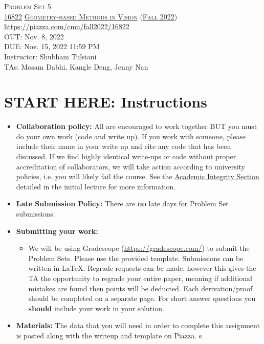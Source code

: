 \documentclass[11pt,addpoints,answers]{exam}
\title{\textsc{\hwName}} %
\author{}
\date{}
\date{}
\numberwithin{equation}{section} %
\numberwithin{figure}{section} %
\numberwithin{table}{section} %
\newcommand{\courseNum}{\href{https://geometric3d.github.io}{16822}}
\newcommand{\courseName}{\href{https://geometric3d.github.io}{Geometry-based Methods in Vision}}
\newcommand{\courseSem}{\href{https://geometric3d.github.io}{Fall 2022}}
\newcommand{\courseUrl}{\url{https://piazza.com/cmu/fall2022/16822}}
\newcommand{\hwNum}{Problem Set 5}
\newcommand{\hwTopic}{N-view Geometry}
\newcommand{\outDate}{Nov. 8, 2022}
\newcommand{\dueDate}{Nov. 15, 2022 11:59 PM}
\newcommand{\instructorName}{Shubham Tulsiani}
\newcommand{\taNames}{Mosam Dabhi, Kangle Deng, Jenny Nan}
\begin{document}
\section*{}
\begin{center}
  \textsc{\LARGE \hwNum} \\
  \vspace{1em}
  \textsc{\large \courseNum{} \courseName{} (\courseSem)} \\
  \courseUrl\\
  \vspace{1em}
  OUT: \outDate \\
  DUE: \dueDate \\
  Instructor: \instructorName \\
  TAs: \taNames
\end{center}

\section*{START HERE: Instructions}
\begin{itemize}
\item \textbf{Collaboration policy:} All are encouraged to work together BUT you must do your own work (code and write up). If you work with someone, please include their name in your write up and cite any code that has been discussed. If we find highly identical write-ups or code without proper accreditation of collaborators, we will take action according to university policies, i.e. you will likely fail the course. See the \href{https://www.dropbox.com/s/z6o0tinc9eaez46/L01_Overview.pdf?dl=0}{Academic Integrity Section} detailed in the initial lecture for more information.

\item\textbf{Late Submission Policy:} There are \textbf{no} late days for Problem Set submissions.

\item\textbf{Submitting your work:}

\begin{itemize}

\item We will be using Gradescope (\url{https://gradescope.com/}) to submit the Problem Sets. Please use the provided template. Submissions can be written in LaTeX. Regrade requests can be made, however this gives the TA the opportunity to regrade your entire paper, meaning if additional mistakes are found then points will be deducted.
Each derivation/proof should be  completed on a separate page. For short answer questions you \textbf{should} include your work in your solution.  
\end{itemize}

\item \textbf{Materials:} The data that you will need in order to complete this assignment is posted along with the writeup and template on Piazza.
s
\end{itemize}
\clearpage
\end{document}

